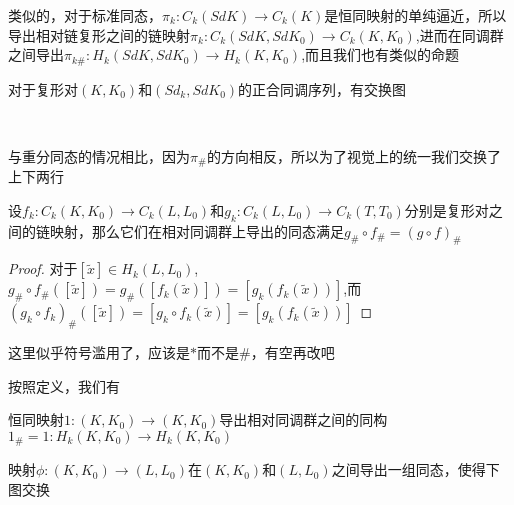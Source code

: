 类似的，对于标准同态，$\pi_{k}:C_{k}(SdK)\rightarrow C_{k}(K)$是恒同映射的单纯逼近，所以导出相对链复形之间的链映射$\pi_{k}:C_{k}(SdK,SdK_{0})\rightarrow C_{k}(K,K_{0})$,进而在同调群之间导出$\pi_{k\#}:H_{k}(SdK,SdK_{0})\rightarrow H_{k}(K,K_{0})$,而且我们也有类似的命题
\begin{proposition}
对于复形对$(K,K_{0})$和$(Sd_{k},SdK_{0})$的正合同调序列，有交换图
{
\center
{}\\
}
\end{proposition}
\begin{remark}
与重分同态的情况相比，因为$\pi_{\#}$的方向相反，所以为了视觉上的统一我们交换了上下两行
\end{remark}
\begin{proposition}\label{chap3_pro_445}
设$f_{k}:C_{k}(K,K_{0})\rightarrow C_{k}(L,L_{0})$和$g_{k}:C_{k}(L,L_{0})\rightarrow C_{k}(T,T_{0})$分别是复形对之间的链映射，那么它们在相对同调群上导出的同态满足$g_{\#}\circ f_{\#}=(g\circ f)_{\#}$
\end{proposition}
\begin{proof}
对于$[\tilde{x}]\in H_{k}(L,L_{0})$,$g_{\#}\circ f_{\#}([\tilde{x}])=g_{\#}([f_{k}(\tilde{x})])=[g_{k}(f_{k}(\tilde{x}))]$,而$(g_{k}\circ f_{k})_{\#}([\tilde{x}])=[g_{k}\circ f_{k}(\tilde{x})]=[g_{k}(f_{k}(\tilde{x}))]$
\end{proof}
\begin{remark}
这里似乎符号滥用了，应该是$*$而不是$\#$，有空再改吧
\end{remark}
按照定义，我们有
\begin{proposition}\label{chap3_pro_455}
恒同映射$1:(K,K_{0})\rightarrow (K,K_{0})$导出相对同调群之间的同构$1_{\#}=1:H_{k}(K,K_{0})\rightarrow H_{k}(K,K_{0})$
\end{proposition}
\begin{proposition}
映射$\phi:(K,K_{0})\rightarrow (L,L_{0})$在$(K,K_{0})$和$(L,L_{0})$之间导出一组同态，使得下图交换
{
\center{}\\
}
\end{proposition}

